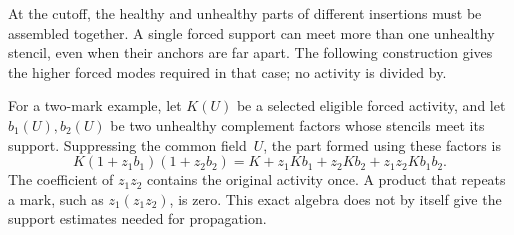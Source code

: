 At the cutoff, the healthy and unhealthy parts of different insertions
must be assembled together. A single forced support can meet more than
one unhealthy stencil, even when their anchors are far apart. The
following construction gives the higher forced modes required in that
case; no activity is divided by.

For a two-mark example, let $K(U)$ be a selected eligible forced
activity, and let $b_1(U),b_2(U)$ be two unhealthy complement factors
whose stencils meet its support. Suppressing the common field~$U$, the
part formed using these factors is
\[
 K(1+z_1b_1)(1+z_2b_2)
 =K+z_1Kb_1+z_2Kb_2+z_1z_2Kb_1b_2.
\]
The coefficient of $z_1z_2$ contains the original activity once. A
product that repeats a mark, such as $z_1(z_1z_2)$, is zero. This exact
algebra does not by itself give the support estimates needed for
propagation.

